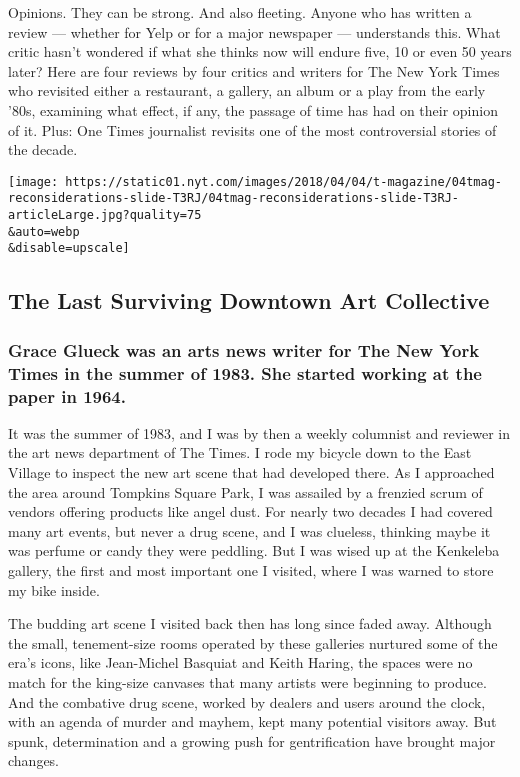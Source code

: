 Opinions. They can be strong. And also fleeting. Anyone who has written
a review --- whether for Yelp or for a major newspaper --- understands
this. What critic hasn't wondered if what she thinks now will endure
five, 10 or even 50 years later? Here are four reviews by four critics
and writers for The New York Times who revisited either a restaurant, a
gallery, an album or a play from the early '80s, examining what effect,
if any, the passage of time has had on their opinion of it. Plus: One
Times journalist revisits one of the most controversial stories of the
decade.

\texttt{[image: https://static01.nyt.com/images/2018/04/04/t-magazine/04tmag-reconsiderations-slide-T3RJ/04tmag-reconsiderations-slide-T3RJ-articleLarge.jpg?quality=75\\\&auto=webp\\\&disable=upscale]}

\hypertarget{the-last-surviving-downtown-art-collective}{%
\subsection{The Last Surviving Downtown Art
Collective}\label{the-last-surviving-downtown-art-collective}}

\hypertarget{grace-glueck-was-an-arts-news-writer-for-the-new-york-times-in-the-summer-of-1983-she-started-working-at-the-paper-in-1964}{%
\subsubsection{Grace Glueck was an arts news writer for The New York
Times in the summer of 1983. She started working at the paper in
1964.}\label{grace-glueck-was-an-arts-news-writer-for-the-new-york-times-in-the-summer-of-1983-she-started-working-at-the-paper-in-1964}}

It was the summer of 1983, and I was by then a weekly columnist and
reviewer in the art news department of The Times. I rode my bicycle down
to the East Village to inspect the new art scene that had developed
there. As I approached the area around Tompkins Square Park, I was
assailed by a frenzied scrum of vendors offering products like angel
dust. For nearly two decades I had covered many art events, but never a
drug scene, and I was clueless, thinking maybe it was perfume or candy
they were peddling. But I was wised up at the Kenkeleba gallery, the
first and most important one I visited, where I was warned to store my
bike inside.

The budding art scene I visited back then has long since faded away.
Although the small, tenement-size rooms operated by these galleries
nurtured some of the era's icons, like Jean-Michel Basquiat and Keith
Haring, the spaces were no match for the king-size canvases that many
artists were beginning to produce. And the combative drug scene, worked
by dealers and users around the clock, with an agenda of murder and
mayhem, kept many potential visitors away. But spunk, determination and
a growing push for gentrification have brought major changes.

